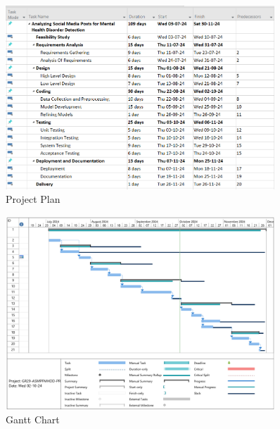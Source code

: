 \begin{figure}[h!]  
    \centering
    \includegraphics[width=0.9\textwidth]{Images/MS Project Plan Sem 7.png}  
    \caption{Project Plan}
    \label{Project Plan}  %
\end{figure}

\vspace{2cm}

\begin{figure}[h!]  
    \centering
    \includegraphics[width=0.9\textwidth]{Images/Gantt Chart.png}  
    \caption{Gantt Chart}
    \label{Gantt Chart}  %
\end{figure}


\pagebreak
